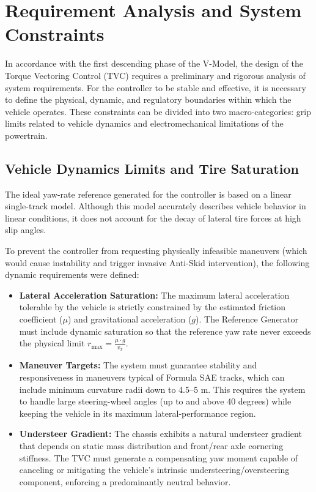 \documentclass[12pt]{report}
\begin{document}
\chapter{Requirement Analysis and System Constraints}
\label{chap:requirement_analysis}

In accordance with the first descending phase of the V-Model, the design of the Torque Vectoring Control (TVC) requires a preliminary and rigorous analysis of system requirements. For the controller to be stable and effective, it is necessary to define the physical, dynamic, and regulatory boundaries within which the vehicle operates. These constraints can be divided into two macro-categories: grip limits related to vehicle dynamics and electromechanical limitations of the powertrain.

\section{Vehicle Dynamics Limits and Tire Saturation}
\label{sec:vehicle_dynamics_limits}

The ideal yaw-rate reference generated for the controller is based on a linear single-track model. Although this model accurately describes vehicle behavior in linear conditions, it does not account for the decay of lateral tire forces at high slip angles.

To prevent the controller from requesting physically infeasible maneuvers (which would cause instability and trigger invasive Anti-Skid intervention), the following dynamic requirements were defined:

\begin{itemize}
  \item \textbf{Lateral Acceleration Saturation:} The maximum lateral acceleration tolerable by the vehicle is strictly constrained by the estimated friction coefficient ($\mu$) and gravitational acceleration ($g$). The Reference Generator must include dynamic saturation so that the reference yaw rate never exceeds the physical limit $r_{\max} = \frac{\mu \cdot g}{v_x}$.

  \item \textbf{Maneuver Targets:} The system must guarantee stability and responsiveness in maneuvers typical of Formula SAE tracks, which can include minimum curvature radii down to 4.5--5 m. This requires the system to handle large steering-wheel angles (up to and above 40 degrees) while keeping the vehicle in its maximum lateral-performance region.

  \item \textbf{Understeer Gradient:} The chassis exhibits a natural understeer gradient that depends on static mass distribution and front/rear axle cornering stiffness. The TVC must generate a compensating yaw moment capable of canceling or mitigating the vehicle's intrinsic understeering/oversteering component, enforcing a predominantly neutral behavior.
\end{itemize}
\end{document}
